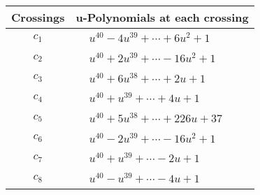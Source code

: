 \documentclass[1p]{elsarticle_modified}
\theoremstyle{definition}
\begin{document}
\begin{tabular}{m{50pt}|m{274pt}}
Crossings & \hspace{64pt}u-Polynomials at each crossing \\
\hline $$\begin{aligned}c_{1}\end{aligned}$$&$\begin{aligned}
&u^{40}-4 u^{39}+\cdots+6 u^2+1
\end{aligned}$\\
\hline $$\begin{aligned}c_{2}\end{aligned}$$&$\begin{aligned}
&u^{40}+2 u^{39}+\cdots-16 u^2+1
\end{aligned}$\\
\hline $$\begin{aligned}c_{3}\end{aligned}$$&$\begin{aligned}
&u^{40}+6 u^{38}+\cdots+2 u+1
\end{aligned}$\\
\hline $$\begin{aligned}c_{4}\end{aligned}$$&$\begin{aligned}
&u^{40}+u^{39}+\cdots+4 u+1
\end{aligned}$\\
\hline $$\begin{aligned}c_{5}\end{aligned}$$&$\begin{aligned}
&u^{40}+5 u^{38}+\cdots+226 u+37
\end{aligned}$\\
\hline $$\begin{aligned}c_{6}\end{aligned}$$&$\begin{aligned}
&u^{40}-2 u^{39}+\cdots-16 u^2+1
\end{aligned}$\\
\hline $$\begin{aligned}c_{7}\end{aligned}$$&$\begin{aligned}
&u^{40}+u^{39}+\cdots-2 u+1
\end{aligned}$\\
\hline $$\begin{aligned}c_{8}\end{aligned}$$&$\begin{aligned}
&u^{40}- u^{39}+\cdots-4 u+1
\end{aligned}$\\

\end{tabular}
\end{document}
